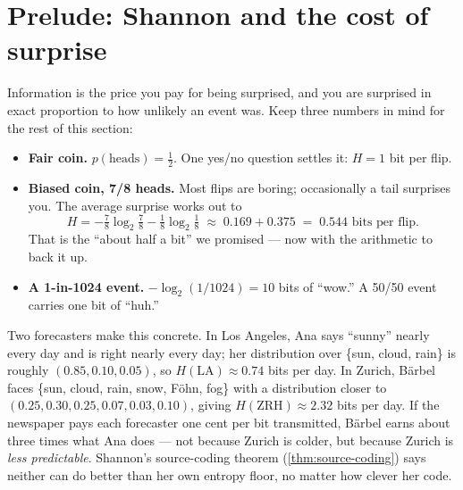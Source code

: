 \documentclass[12pt,a4paper]{article}
\theoremstyle{plain}
\theoremstyle{definition}
\begin{document}

\section{Prelude: Shannon and the cost of surprise}
\label{sec:shannon-prelude}

\begin{intuition}
Information is the price you pay for being surprised, and you are
surprised in exact proportion to how unlikely an event was. Keep
three numbers in mind for the rest of this section:

\begin{itemize}[leftmargin=2em,itemsep=1pt]
  \item \textbf{Fair coin.} $p(\text{heads}) = \tfrac12$. One yes/no
    question settles it: $H = 1$ bit per flip.
  \item \textbf{Biased coin, 7/8 heads.} Most flips are boring;
    occasionally a tail surprises you. The average surprise works out
    to
    \[
      H = -\tfrac78\log_2\tfrac78 - \tfrac18\log_2\tfrac18
        \;\approx\; 0.169 + 0.375 \;=\; 0.544 \text{ bits per flip}.
    \]
    That is the ``about half a bit'' we promised --- now with the
    arithmetic to back it up.
  \item \textbf{A 1-in-1024 event.} $-\log_2(1/1024) = 10$ bits of
    ``wow.'' A 50/50 event carries one bit of ``huh.''
\end{itemize}

Two forecasters make this concrete. In Los Angeles, Ana says
``sunny'' nearly every day and is right nearly every day; her
distribution over \{sun, cloud, rain\} is roughly
$(0.85, 0.10, 0.05)$, so $H(\text{LA}) \approx 0.74$ bits per day.
In Zurich, B\"arbel faces \{sun, cloud, rain, snow, F\"{o}hn, fog\}
with a distribution closer to $(0.25, 0.30, 0.25, 0.07, 0.03, 0.10)$,
giving $H(\text{ZRH}) \approx 2.32$ bits per day. If the newspaper
pays each forecaster one cent per bit transmitted, B\"arbel earns
about three times what Ana does --- not because Zurich is colder,
but because Zurich is \emph{less predictable}. Shannon's
source-coding theorem (\cref{thm:source-coding}) says neither can do
better than her own entropy floor, no matter how clever her code.


\end{intuition}
\end{document}
